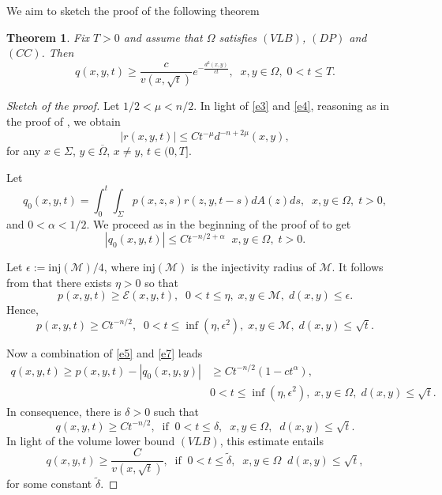 \documentclass{birkjour}
\newtheorem{theorem}{Theorem}[section]
\begin{document}
\smallskip
We aim to sketch the proof of the following theorem

\begin{theorem}\label{thmGLB}
Fix $T>0$ and assume that $\Omega$ satisfies $(VLB)$, $(DP)$ and $(CC)$. Then
\begin{equation}\label{e9}
q(x,y,t)\geq \frac{c}{v(x,\sqrt{t})}e^{-\frac{d^2(x,y)}{ct}}, \;\; x,y\in \Omega ,\; 0<t\leq T.
\end{equation}
\end{theorem}

\begin{proof}[Sketch of the proof]
Let $1/2 <\mu < n/2$. In light of \eqref{e3} and \eqref{e4}, reasoning as in the proof of \cite[Lemma 3.1]{CK}, we obtain
\[
|r(x,y,t)|\leq Ct^{-\mu}d^{-n+2\mu}(x,y),
\]
for any $x\in \Sigma $, $y\in \overline{\Omega}$, $x\neq y$, $t\in (0,T]$.

Let
\[
q_0(x,y,t)=\int_0^t\int_\Sigma p(x,z,s)r(z,y,t-s)dA(z)ds,\;\; x,y\in \Omega ,\; t>0,
\]
and $0<\alpha <1/2$. We proceed as in the beginning of the proof of \cite[Theorem 3.1]{CK} to get
\begin{equation}\label{e5}
|q_0(x,y,t)|\leq Ct^{-n/2+\alpha }\;\; x,y\in \Omega ,\; t>0.
\end{equation}

Let $\epsilon :=\textrm{inj}(\mathcal{M})/4$, where $\textrm{inj}(\mathcal{M})$ is the injectivity radius of $\mathcal{M}$. It follows from \cite[formula (45), page 154]{Cha} that there exists $\eta >0$ so that
\begin{equation}\label{e6}
p(x,y,t)\geq \mathscr{E}(x,y,t),\;\;  0<t\le \eta ,\; x,y\in \mathcal{M},\; d(x,y)\leq \epsilon .
\end{equation}
Hence,
\begin{equation}\label{e7}
p(x,y,t)\geq Ct^{-n/2},\;\; 0<t\le \inf (\eta ,\epsilon ^2),\; x,y\in \mathcal{M},\; d(x,y)\leq \sqrt{t}.
\end{equation}

Now a combination of \eqref{e5} and \eqref{e7} leads
\begin{align*}
q(x,y,t)\geq p(x,y,t)-|q_0(x,y,y)|&\geq Ct^{-n/2}(1-ct^\alpha),
\\
& 0<t\le \inf (\eta ,\epsilon ^2),\; x,y\in \Omega ,\; d(x,y)\leq \sqrt{t}.
\end{align*}
In consequence, there is $\delta >0$ such that
\begin{equation}\label{e8_0}
q(x,y,t)\geq Ct^{-n/2},\;\; \mbox{if}\;\; 0<t\leq \delta ,\;\; x,y\in \Omega ,\;\; d(x,y)\leq \sqrt{t}.
\end{equation}
In light of the volume lower bound $(VLB)$, this estimate entails
\begin{equation}\label{e8}
q(x,y,t)\geq \frac{C}{v(x,\sqrt{t})},\;\; \mbox{if}\;\; 0<t\leq \widetilde{\delta} ,\;\; x,y\in \Omega\;\; d(x,y)\leq \sqrt{t},
\end{equation}
for some constant $\widetilde{\delta}$.


\end{proof}
\end{document}
